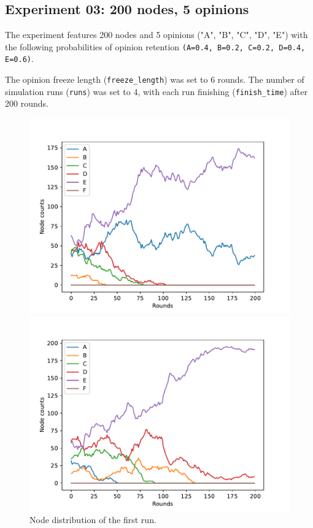 \documentclass[11pt]{article}
\begin{document}
\pagebreak

\subsection*{Experiment 03: 200 nodes, 5 opinions}

The experiment features 200 nodes and 5 opinions ("A", "B", "C", "D", "E") with the following probabilities of opinion retention \verb|(A=0.4, B=0.2, C=0.2, D=0.4, E=0.6)|.

\medskip

\noindent The opinion freeze length (\verb|freeze_length|) was set to 6 rounds. The number of simulation runs (\verb|runs|) was set to 4, with each run finishing (\verb|finish_time|) after 200 rounds.

\begin{figure}[ht] 
  \label{ fig7} 
  \begin{minipage}[b]{0.5\linewidth}
    \centering
    \includegraphics[width=0.9\linewidth]{results/03/run-1/distribution} 
    \caption{Node distribution of the first run.} 
  \end{minipage}%
  \begin{minipage}[b]{0.5\linewidth}
    \centering
    \includegraphics[width=0.9\linewidth]{results/03/run-2/distribution} 

\end{minipage}
\end{figure}
\end{document}
